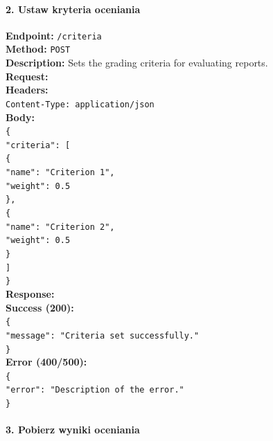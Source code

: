 \documentclass[a4paper, 12pt]{article}
\begin{document}
\paragraph{2. Ustaw kryteria oceniania}

\begin{tabbing}
\textbf{Endpoint:} \= \texttt{/criteria} \\
\textbf{Method:} \> \texttt{POST} \\
\textbf{Description:} \> Sets the grading criteria for evaluating reports. \\
\textbf{Request:} \\
\> \textbf{Headers:} \\
\> \> \texttt{Content-Type: application/json} \\
\> \textbf{Body:} \\
\> \> \texttt{\{ \\
\> \> \> "criteria": [ \\
\> \> \> \> \{ \\
\> \> \> \> \> "name": "Criterion 1", \\
\> \> \> \> \> "weight": 0.5 \\
\> \> \> \> \}, \\
\> \> \> \> \{ \\
\> \> \> \> \> "name": "Criterion 2", \\
\> \> \> \> \> "weight": 0.5 \\
\> \> \> \> \} \\
\> \> \> ] \\
\> \> \}} \\
\textbf{Response:} \\
\> \textbf{Success (200):} \\
\> \> \texttt{\{ \\
\> \> \> "message": "Criteria set successfully." \\
\> \> \}} \\
\> \textbf{Error (400/500):} \\
\> \> \texttt{\{ \\
\> \> \> "error": "Description of the error." \\
\> \> \}}
\end{tabbing}

\paragraph{3. Pobierz wyniki oceniania}
\end{document}
